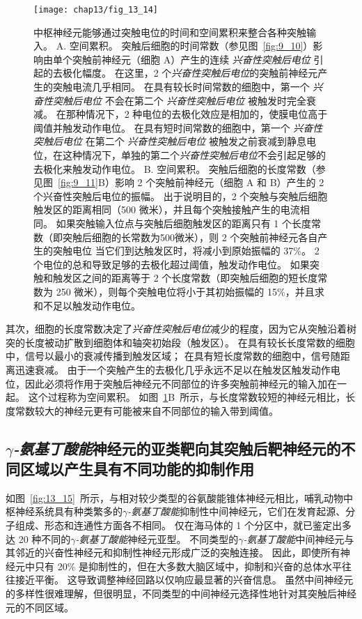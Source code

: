 \begin{figure}[htbp]
	\centering
	\texttt{[image: chap13/fig\_13\_14]}
	\caption{中枢神经元能够通过突触电位的时间和空间累积来整合各种突触输入。
		A. 空间累积。
		突触后细胞的时间常数（参见图~\ref{fig:9_10}）影响由单个突触前神经元（细胞 A）产生的连续 \textit{兴奋性突触后电位} 引起的去极化幅度。
		在这里，2 个\textit{兴奋性突触后电位}的突触前神经元产生的突触电流几乎相同。
		在具有较长时间常数的细胞中，第一个 \textit{兴奋性突触后电位} 不会在第二个 \textit{兴奋性突触后电位} 被触发时完全衰减。
		在那种情况下，2 种电位的去极化效应是相加的，使膜电位高于阈值并触发动作电位。
		在具有短时间常数的细胞中，第一个 \textit{兴奋性突触后电位} 在第二个 \textit{兴奋性突触后电位} 被触发之前衰减到静息电位，在这种情况下，单独的第二个\textit{兴奋性突触后电位}不会引起足够的去极化来触发动作电位。
		B. 空间累积。
		突触后细胞的长度常数（参见图~\ref{fig:9_11}B）影响 2 个突触前神经元（细胞 A 和 B）产生的 2 个兴奋性突触后电位的振幅。
		出于说明目的，2 个突触与突触后细胞触发区的距离相同（500 微米），并且每个突触接触产生的电流相同。
		如果突触输入位点与突触后细胞触发区的距离只有 1 个长度常数（即突触后细胞的长常数为500微米），则 2 个突触前神经元各自产生的突触电位 当它们到达触发区时，将减小到原始振幅的 37\%。
		2 个电位的总和导致足够的去极化超过阈值，触发动作电位。
		如果突触和触发区之间的距离等于 2 个长度常数（即突触后细胞的短长度常数为 250 微米），则每个突触电位将小于其初始振幅的 15\%，并且求和不足以触发动作电位。}
	\label{fig:13_14}
\end{figure}


其次，细胞的长度常数决定了\textit{兴奋性突触后电位}减少的程度，因为它从突触沿着树突的长度被动扩散到细胞体和轴突初始段（触发区）。
在具有较长长度常数的细胞中，信号以最小的衰减传播到触发区域；
在具有短长度常数的细胞中，信号随距离迅速衰减。
由于一个突触产生的去极化几乎永远不足以在触发区触发动作电位，因此必须将作用于突触后神经元不同部位的许多突触前神经元的输入加在一起。
这个过程称为空间累积。
如图~\ref{fig:13_14}B~所示，与长度常数较短的神经元相比，长度常数较大的神经元更有可能被来自不同部位的输入带到阈值。



\subsection{\textit{$\gamma$-氨基丁酸能}神经元的亚类靶向其突触后靶神经元的不同区域以产生具有不同功能的抑制作用}

如图~\ref{fig:13_15}~所示，与相对较少类型的谷氨酸能锥体神经元相比，哺乳动物中枢神经系统具有种类繁多的\textit{$\gamma$-氨基丁酸能}抑制性中间神经元，它们在发育起源、分子组成、形态和连通性方面各不相同。
仅在海马体的 1 个分区中，就已鉴定出多达 20 种不同的\textit{$\gamma$-氨基丁酸能}神经元亚型。
不同类型的\textit{$\gamma$-氨基丁酸能}中间神经元与其邻近的兴奋性神经元和抑制性神经元形成广泛的突触连接。
因此，即使所有神经元中只有 20\% 是抑制性的，但在大多数大脑区域中，抑制和兴奋的总体水平往往接近平衡。
这导致调整神经回路以仅响应最显著的兴奋信息。
虽然中间神经元的多样性很难理解，但很明显，不同类型的中间神经元选择性地针对其突触后神经元的不同区域。


